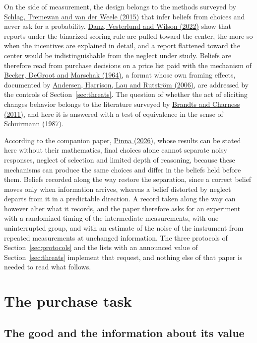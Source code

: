 \documentclass[11pt,a4paper]{article}
\newcommand{\cy}[2]{\hyperlink{cite.#1}{\textcolor{citecolor}{#2}}}
\begin{document}
On the side of measurement, the design belongs to the methods surveyed by \cy{schlag}{Schlag, Tremewan and van der Weele (2015)} that infer beliefs from choices and never ask for a probability. \cy{danz}{Danz, Vesterlund and Wilson (2022)} show that reports under the binarized scoring rule are pulled toward the center, the more so when the incentives are explained in detail, and a report flattened toward the center would be indistinguishable from the neglect under study. Beliefs are therefore read from purchase decisions on a price list paid with the mechanism of \cy{bdm}{Becker, DeGroot and Marschak (1964)}, a format whose own framing effects, documented by \cy{andersen}{Andersen, Harrison, Lau and Rutstr\"om (2006)}, are addressed by the controls of Section~\ref{sec:threats}. The question of whether the act of eliciting changes behavior belongs to the literature surveyed by \cy{brandts}{Brandts and Charness (2011)}, and here it is answered with a test of equivalence in the sense of \cy{schuirmann}{Schuirmann (1987)}.

According to the companion paper, \cy{pinna}{Pinna (2026)}, whose results can be stated here without their mathematics, final choices alone cannot separate noisy responses, neglect of selection and limited depth of reasoning, because these mechanisms can produce the same choices and differ in the beliefs held before them. Beliefs recorded along the way restore the separation, since a correct belief moves only when information arrives, whereas a belief distorted by neglect departs from it in a predictable direction. A record taken along the way can however alter what it records, and the paper therefore asks for an experiment with a randomized timing of the intermediate measurements, with one uninterrupted group, and with an estimate of the noise of the instrument from repeated measurements at unchanged information. The three protocols of Section~\ref{sec:protocols} and the lists with an announced value of Section~\ref{sec:threats} implement that request, and nothing else of that paper is needed to read what follows.

\section{The purchase task}\label{sec:task}

\subsection{The good and the information about its value}
\end{document}
